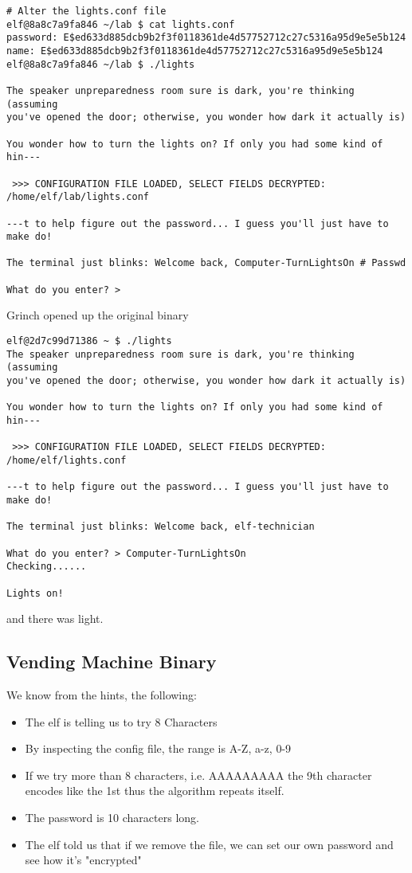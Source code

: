 \begin{verbatim}
# Alter the lights.conf file
elf@8a8c7a9fa846 ~/lab $ cat lights.conf
password: E$ed633d885dcb9b2f3f0118361de4d57752712c27c5316a95d9e5e5b124
name: E$ed633d885dcb9b2f3f0118361de4d57752712c27c5316a95d9e5e5b124
elf@8a8c7a9fa846 ~/lab $ ./lights

The speaker unpreparedness room sure is dark, you're thinking (assuming
you've opened the door; otherwise, you wonder how dark it actually is)

You wonder how to turn the lights on? If only you had some kind of hin---

 >>> CONFIGURATION FILE LOADED, SELECT FIELDS DECRYPTED: /home/elf/lab/lights.conf

---t to help figure out the password... I guess you'll just have to make do!

The terminal just blinks: Welcome back, Computer-TurnLightsOn # Passwd

What do you enter? >
\end{verbatim}

Grinch opened up the original binary
\begin{verbatim}
elf@2d7c99d71386 ~ $ ./lights
The speaker unpreparedness room sure is dark, you're thinking (assuming
you've opened the door; otherwise, you wonder how dark it actually is)

You wonder how to turn the lights on? If only you had some kind of hin---

 >>> CONFIGURATION FILE LOADED, SELECT FIELDS DECRYPTED: /home/elf/lights.conf

---t to help figure out the password... I guess you'll just have to make do!

The terminal just blinks: Welcome back, elf-technician

What do you enter? > Computer-TurnLightsOn
Checking......

Lights on!
\end{verbatim}
and there was light.

\subsection{Vending Machine Binary}
We know from the hints, the following:
\begin{itemize}
  \item The elf is telling us to try 8 Characters
  \item By inspecting the config file, the range is A-Z, a-z, 0-9
  \item If we try more than 8 characters, i.e. AAAAAAAAA the 9th character encodes like the 1st thus the algorithm repeats itself.
  \item The password is 10 characters long.
  \item The elf told us that if we remove the file, we can set our own password and see how it's "encrypted"
\end{itemize}

